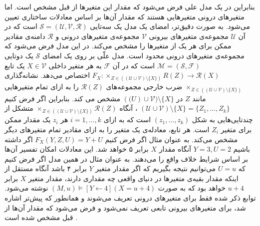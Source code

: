 \documentclass[
msc,
irfonts
]{./tex/tehran-thesis}
\newcommand{\پ}{پروژه/پایان‌نامه/رساله }
\theoremstyle{definition}
\theoremstyle{theorem}
\theoremstyle{definition}
\numberwithin{algorithm}{chapter}
\newcommand{\s}[1]{\{#1\}}
\newcommand{\la}{\leftarrow}
\newcommand{\mc}[1]{\mathcal{#1}}
\newcommand{\lf}[1]{\LTRfootnote{#1}}
\begin{document}
بنابراین در یک مدل علی فرض می‌شود که مقدار این متغیر‌ها از قبل مشخص است.
اما متغیر‌های درونی متغیرهایی هستند که مقدار آن‌ها بر اساس معادلات ساختاری تعیین می‌شود.
به صورت دقیق‌تر، امضای\lf{Signature}
یک مدل یک سه‌تایی
$\mc{S} = (\mc{U},\mc{V},\mc{R})$
است که در آن
$\mc{U}$
مجموعه‌ی متغیر‌های بیرونی
$\mc{V}$
مجموعه‌ی متغیر‌های درونی و
$\mc{R}$
دامنه‌ی مقادیر ممکن برای هر یک از متغیر‌ها را مشخص می‌کند.
در این مدل فرض می‌شود که مجموعه‌ی متغیر‌های درونی محدود است.
مدل علّی بر روی یک امضای
$\mc{S}$
یک دوتایی
$\mc{M} = (\mc{S},\mc{F})$
است که در آن
$\mc{F}$
به هر متغیر داخلی
$X \in \mc{V}$
یک تابع
$F_X: \times_{Z\in ((\mc{U}\cup \mc{V})\setminus \s{X})}R(Z)
\rightarrow \mathcal{R}(X)$
اختصاص می‌دهد.
نشانه‌گذاری
$\times_{Z\in ((\mc{U}\cup \mc{V})\setminus \s{X})}$
ضرب خارجی\lf{Cross-Product}
مجموعه‌های
$\mc{R}(Z)$
را به ازای تمام متغیر‌هایی مانند 
$Z$
در 
$(\mc(U)\cup \mc{V}) \setminus \s{X}$
مشخص می کند.
بنابراین اگر فرض کنیم
$(\mc{U}\cup \mc{V})\setminus \s{X} = \s{Z_1,...,Z_k}$
، آنگاه 
$\times_{Z\in ((\mc{U}\cup \mc{V})\setminus \s{X})}\mc{R}(Z)$
متشکل از چندتایی‌هایی به شکل
$(z_1,...,z_k)$
است که به ازای 
$i = 1,...,k$
هر 
$z_i$
یک مقدار ممکن برای متغیر 
$Z_i$
است.
هر تابع، معادله‌ی یک متغیر را به ازای مقادیر تمام متغیر‌های دیگر مشخص می‌کند.
به عنوان مثال اگر فرض کنیم
$F_X(Y,Z,U) = Y + U$
اگر داشته باشیم
$Y=3, U=2$
آنگاه مقدار
$X$
برابر ۵ خواهد شد.
این معادلات امکان تفسیر آن‌ها بر اساس شرایط خلاف واقع را می‌دهند.
به عنوان مثال در همین مدل اگر فرض کنیم که
$U=u$
می‌توانیم نتیجه بگیریم که اگر مقدار متغیر
$Y$
برابر ۴ باشد آنگاه مستقل از اینکه مقدار بقیه‌ی متغیر‌ها در دنیای واقعی چه مقداری دارند، مقدار متغیر
$X$
برابر
$u+4$
خواهد بود که به صورت
$(M,u) \vDash [Y \la 4](X = u + 4)$
نوشته می‌شود.
توابع ذکر شده فقط برای متغیر‌های درونی تعریف می‌شوند و همانطور که پیش‌تر اشاره شد، برای متغیرهای بیرونی تابعی تعریف نمی‌شود و فرض می‌شود که مقدار آن‌ها از قبل مشخص شده است
\cite{Halpern_2016}.
\end{document}
